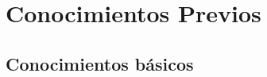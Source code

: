 \documentclass[
    11pt, %
    a4paper, %
]{

}
\begin{document}


    \pagestyle{empty} %

    \tableofcontents %



    \pagestyle{fancy} %

    \cleardoublepage %



    \part{Conocimientos Previos}


    \chapterspaceabove{6.75cm} %
    \chapterspacebelow{7.25cm} %




    \chapter{Conocimientos básicos}

    
\end{document}
